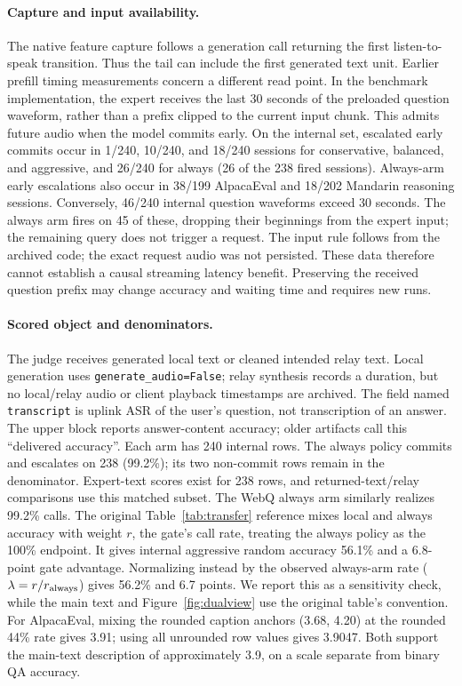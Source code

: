 \paragraph{Capture and input availability.}
The native feature capture follows a generation call returning the
first listen-to-speak transition. Thus the tail can include the first
generated text unit. Earlier prefill timing measurements concern a
different read point. In the benchmark implementation, the expert
receives the last 30 seconds of the preloaded question waveform,
rather than a prefix clipped to the current input chunk. This admits
future audio when the model commits early. On the internal set,
escalated early commits occur in 1/240, 10/240, and 18/240 sessions
for conservative, balanced, and aggressive, and 26/240 for always
(26 of the 238 fired sessions). Always-arm early escalations also
occur in 38/199 AlpacaEval and 18/202 Mandarin reasoning sessions.
Conversely, 46/240 internal question waveforms exceed 30 seconds.
The always arm fires on 45 of these, dropping their beginnings from
the expert input; the remaining query does not trigger a request.
The input rule follows from the archived code; the exact request
audio was not persisted. These data therefore cannot establish a
causal streaming latency benefit. Preserving the received question
prefix may change accuracy and waiting time and requires new runs.

\paragraph{Scored object and denominators.}
The judge receives generated local text or cleaned intended relay
text. Local generation uses \texttt{generate\_audio=False}; relay
synthesis records a duration, but no local/relay audio or client
playback timestamps are archived. The field named \texttt{transcript}
is uplink ASR of the user's question, not transcription of an answer.
The upper block reports answer-content accuracy; older artifacts
call this ``delivered accuracy''. Each arm has 240 internal rows. The always
policy commits and escalates on 238 (99.2\%); its two non-commit
rows remain in the denominator. Expert-text scores exist for 238
rows, and returned-text/relay comparisons use this matched subset.
The WebQ always arm similarly realizes 99.2\% calls.
The original Table~\ref{tab:transfer} reference mixes local and always
accuracy with weight $r$, the gate's call rate, treating the always
policy as the 100\% endpoint. It gives internal aggressive random
accuracy 56.1\% and a 6.8-point gate advantage. Normalizing instead
by the observed always-arm rate ($\lambda=r/r_{\rm always}$) gives
56.2\% and 6.7 points. We report this as a sensitivity check, while
the main text and Figure~\ref{fig:dualview} use the original table's
convention. For AlpacaEval, mixing the rounded caption anchors
(3.68, 4.20) at the rounded 44\% rate gives 3.91; using all unrounded
row values gives 3.9047. Both support the main-text description of
approximately 3.9, on a scale separate from binary QA accuracy.

